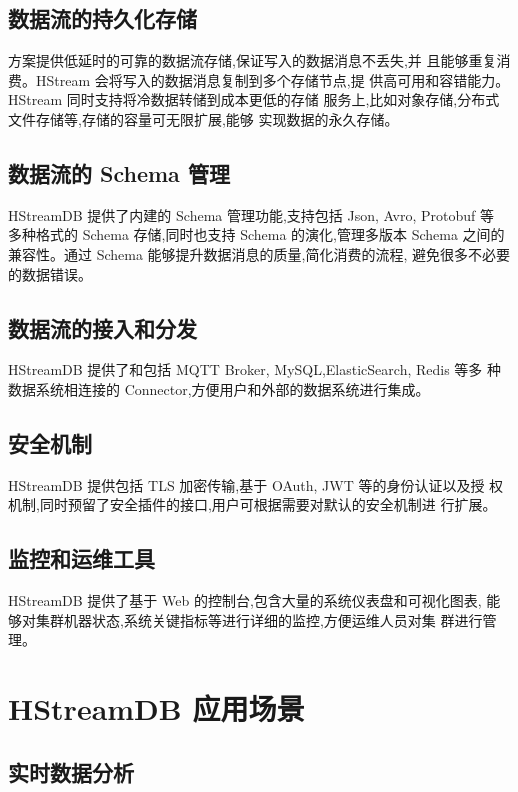 \documentclass{ctexart}
\begin{document}
\subsection{数据流的持久化存储}

方案提供低延时的可靠的数据流存储,保证写入的数据消息不丢失,并
且能够重复消费。HStream 会将写入的数据消息复制到多个存储节点,提
供高可用和容错能力。HStream 同时支持将冷数据转储到成本更低的存储
服务上,比如对象存储,分布式文件存储等,存储的容量可无限扩展,能够
实现数据的永久存储。

\subsection{数据流的 Schema 管理}

HStreamDB 提供了内建的 Schema 管理功能,支持包括 Json, Avro, Protobuf 等
多种格式的 Schema 存储,同时也支持 Schema 的演化,管理多版本 Schema
之间的兼容性。通过 Schema 能够提升数据消息的质量,简化消费的流程,
避免很多不必要的数据错误。

\subsection{数据流的接入和分发}

HStreamDB 提供了和包括 MQTT Broker, MySQL,ElasticSearch, Redis 等多
种数据系统相连接的 Connector,方便用户和外部的数据系统进行集成。

\subsection{安全机制}

HStreamDB 提供包括 TLS 加密传输,基于 OAuth, JWT 等的身份认证以及授
权机制,同时预留了安全插件的接口,用户可根据需要对默认的安全机制进
行扩展。

\subsection{监控和运维工具}

HStreamDB 提供了基于 Web 的控制台,包含大量的系统仪表盘和可视化图表,
能够对集群机器状态,系统关键指标等进行详细的监控,方便运维人员对集
群进行管理。

\section{HStreamDB 应用场景}

\subsection{实时数据分析}
\end{document}
